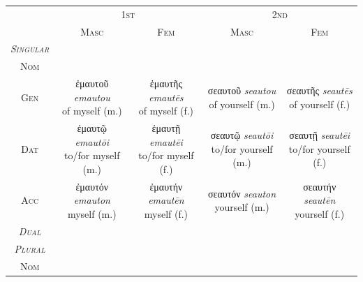 \documentclass[10pt,a4paper,notitlepage]{article}
\newcommand{\tsc}[1]{\textsc{#1}}
\newcommand*{\grc}[1]{\fontspec{Inter}#1\rmfamily}
\newcommand{\trc}[1]{\textit{\fontspec{Tinos}#1}}
\begin{document}
    \begin{table}[H]
        \begin{tabular}{c|cc|cc}
             & \multicolumn{2}{c|}{\tsc{1st}} & \multicolumn{2}{c}{\tsc{2nd}} \\
             & \tsc{Masc} & \tsc{Fem} & \tsc{Masc} & \tsc{Fem} \\

            \hline
            \emph{\tsc{Singular}} & & & & \\
             \tsc{Nom} & \makecell{--} & \makecell{--} & \makecell{--} & \makecell{--}\\

            \tsc{Gen} & \makecell{\grc{ἐμαυτοῦ} \trc{emautou} \\ \small of myself (m.)}
             & \makecell{\grc{ἐμαυτῆς} \trc{emautēs} \\ \small of myself (f.)}
             & \makecell{\grc{σεαυτοῦ} \trc{seautou} \\ \small of yourself (m.)}
             & \makecell{\grc{σεαυτῆς} \trc{seautēs} \\ \small of yourself (f.)}\\

            \tsc{Dat} & \makecell{\grc{ἐμαυτῷ} \trc{emautōi} \\ \small to/for myself (m.)}
             & \makecell{\grc{ἐμαυτῇ} \trc{emautēi} \\ \small to/for myself (f.)}
             & \makecell{\grc{σεαυτῷ} \trc{seautōi} \\ \small to/for yourself (m.)}
             & \makecell{\grc{σεαυτῇ} \trc{seautēi} \\ \small to/for yourself (f.)}\\

            \tsc{Acc} & \makecell{\grc{ἐμαυτόν} \trc{emauton} \\ \small myself (m.)}
             & \makecell{\grc{ἐμαυτήν} \trc{emautēn} \\ \small myself (f.)}
             & \makecell{\grc{σεαυτόν} \trc{seauton} \\ \small yourself (m.)}
             & \makecell{\grc{σεαυτήν} \trc{seautēn} \\ \small yourself (f.)}\\

            \hline
            \emph{\tsc{Dual}} & \makecell{--} & \makecell{--} & \makecell{--} & \makecell{--}\\

            \hline
            \emph{\tsc{Plural}} & & & & \\
            \tsc{Nom} & \makecell{--} & \makecell{--} & \makecell{--} & \makecell{--}\\


\end{tabular}
\end{table}
\end{document}
